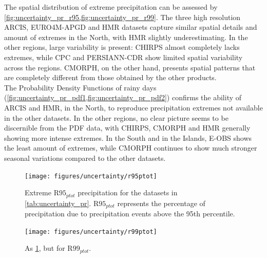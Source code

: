 The spatial distribution of extreme precipitation can be assessed by \cref{fig:uncertainty_pr_r95,fig:uncertainty_pr_r99}. The three high resolution ARCIS, EURO4M-APGD and HMR datasets capture similar spatial details and amount of extremes in the North, with HMR slightly underestimating. In the other regions, large variability is present: CHIRPS almost completely lacks extremes, while CPC and PERSIANN-CDR show limited spatial variability across the regions. CMORPH, on the other hand, presents spatial patterns that are completely different from those obtained by the other products.\\
The Probability Density Functions of rainy days (\cref{fig:uncertainty_pr_pdf1,fig:uncertainty_pr_pdf2}) confirms the ability of ARCIS and HMR, in the North, to reproduce precipitation extremes not available in the other datasets. In the other regions, no clear picture seems to be discernible from the PDF data, with CHIRPS, CMORPH and HMR generally showing more intense extremes. In the South and in the Islands, E-OBS shows the least amount of extremes, while CMORPH continues to show much stronger seasonal variations compared to the other datasets.
\begin{figure}
    \centering
        \texttt{[image: figures/uncertainty/r95ptot]}
    \decoRule
    \caption[Precipitation extreme ($\textrm{R95}_{ptot}$): uncertainty over Italy]{
        Extreme $\textrm{R95}_{ptot}$ precipitation for the datasets in \cref{tab:uncertainty_pr}. $\textrm{R95}_{ptot}$ represents the percentage of precipitation due to precipitation events above the 95th percentile.
} \label{fig:uncertainty_pr_r95}
\end{figure}
\begin{figure}
    \centering
        \texttt{[image: figures/uncertainty/r99ptot]}
    \decoRule
    \caption[Precipitation extreme ($\textrm{R99}_{ptot}$): uncertainty over Italy]{
        As \cref{fig:uncertainty_pr_r95}, but for $\textrm{R99}_{ptot}$.
} \label{fig:uncertainty_pr_r99}
\end{figure}
